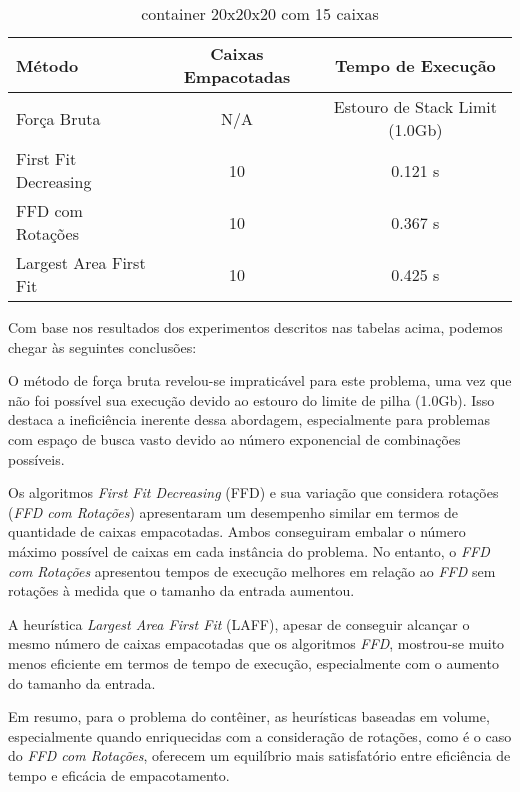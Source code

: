 \documentclass[12pt]{article}
\begin{document}
\begin{table}[H]
	\centering
	\caption{container 20x20x20 com 15 caixas}
	\begin{tabular}{lcc}
		\toprule
		\textbf{Método}        & \textbf{Caixas Empacotadas} & \textbf{Tempo de Execução}     \\
		\midrule
		Força Bruta            & N/A                         & Estouro de Stack Limit (1.0Gb) \\
		First Fit Decreasing   & 10                          & 0.121 s                        \\
		FFD com Rotações       & 10                          & 0.367 s                        \\
		Largest Area First Fit & 10                          & 0.425 s                        \\
		\bottomrule
	\end{tabular}
	\label{tab:resultados_20}
\end{table}

Com base nos resultados dos experimentos descritos nas tabelas acima, podemos chegar às seguintes conclusões:

O método de força bruta revelou-se impraticável para este problema, uma vez que não foi possível sua execução devido ao estouro do limite de pilha (1.0Gb). Isso destaca a ineficiência inerente dessa abordagem, especialmente para problemas com espaço de busca vasto devido ao número exponencial de combinações possíveis.

Os algoritmos \emph{First Fit Decreasing} (FFD) e sua variação que considera rotações (\emph{FFD com Rotações}) apresentaram um desempenho similar em termos de quantidade de caixas empacotadas. Ambos conseguiram embalar o número máximo possível de caixas em cada instância do problema. No entanto, o \emph{FFD com Rotações} apresentou tempos de execução melhores em relação ao \emph{FFD} sem rotações à medida que o tamanho da entrada aumentou.

A heurística \emph{Largest Area First Fit} (LAFF), apesar de conseguir alcançar o mesmo número de caixas empacotadas que os algoritmos \emph{FFD}, mostrou-se muito menos eficiente em termos de tempo de execução, especialmente com o aumento do tamanho da entrada.

Em resumo, para o problema do contêiner, as heurísticas baseadas em volume, especialmente quando enriquecidas com a consideração de rotações, como é o caso do \emph{FFD com Rotações}, oferecem um equilíbrio mais satisfatório entre eficiência de tempo e eficácia de empacotamento.
\end{document}
